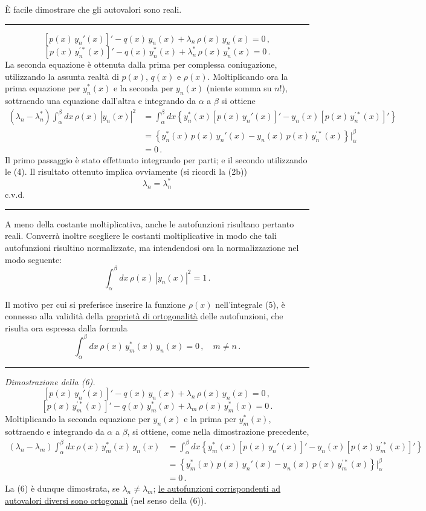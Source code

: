 \documentclass[11pt, a4paper]{book}
\numberwithin{equation}{section}
\begin{document}
È facile dimostrare che gli autovalori sono reali.

\hrule
\medskip
\[
\left[p(x)\,y_n'(x)\right]' - q(x)\,y_n(x) + \lambda_n\,\rho(x)\,y_n(x) = 0\,,
\]
\[
\left[p(x)\,y_n^{\prime*}(x)\right]' - q(x)\,y_n^*(x) + \lambda_n^*\,\rho(x)\,y_n^*(x) = 0\,.
\]
La seconda equazione è ottenuta dalla prima per complessa coniugazione, utilizzando la assunta realtà di $p(x)$, $q(x)$ e $\rho(x)$. Moltiplicando ora la prima equazione per $y_n^*(x)$ e la seconda per $y_n(x)$ (niente somma su $n$!), sottraendo una equazione dall'altra e integrando da $\alpha$ a $\beta$ si ottiene
\begin{align*}
(\lambda_n-\lambda_n^*)\int_\alpha^\beta dx\,\rho(x)\,|y_n(x)|^2
&= \int_\alpha^\beta dx\left\{y_n^*(x)\left[p(x)\,y_n'(x)\right]' - y_n(x)\left[p(x)\,y_n^{\prime*}(x)\right]'\right\}\\
&= \left\{y_n^*(x)\,p(x)\,y_n'(x) - y_n(x)\,p(x)\,y_n^{\prime*}(x)\right\}\Big|_\alpha^\beta\\
&= 0\,.
\end{align*}
Il primo passaggio è stato effettuato integrando per parti; e il secondo utilizzando le (4). Il risultato ottenuto implica ovviamente (si ricordi la (2b))
\[
\lambda_n = \lambda_n^*
\]
c.v.d.
\medskip\hrule\medskip

A meno della costante moltiplicativa, anche le autofunzioni risultano pertanto reali. Converrà inoltre scegliere le costanti moltiplicative in modo che tali autofunzioni risultino normalizzate, ma intendendosi ora la normalizzazione nel modo seguente:
\begin{equation}
\int_\alpha^\beta dx\,\rho(x)\,|y_n(x)|^2 = 1\,. \tag{5}
\end{equation}

Il motivo per cui si preferisce inserire la funzione $\rho(x)$ nell'integrale (5), è connesso alla validità della \underline{proprietà di ortogonalità} delle autofunzioni, che risulta ora espressa dalla formula
\begin{equation}
\int_\alpha^\beta dx\,\rho(x)\,y_m^*(x)\,y_n(x) = 0\,,\quad m\neq n\,. \tag{6}
\end{equation}

\hrule
\medskip
\noindent\textit{Dimostrazione della (6).}
\[
\left[p(x)\,y_n'(x)\right]' - q(x)\,y_n(x) + \lambda_n\,\rho(x)\,y_n(x) = 0\,,
\]
\[
\left[p(x)\,y_m^{\prime*}(x)\right]' - q(x)\,y_m^*(x) + \lambda_m\,\rho(x)\,y_m^*(x) = 0\,.
\]
Moltiplicando la seconda equazione per $y_n(x)$ e la prima per $y_m^*(x)$, sottraendo e integrando da $\alpha$ a $\beta$, si ottiene, come nella dimostrazione precedente,
\begin{align*}
(\lambda_n-\lambda_m)\int_\alpha^\beta dx\,\rho(x)\,y_m^*(x)\,y_n(x)
&= \int_\alpha^\beta dx\left\{y_m^*(x)\left[p(x)\,y_n'(x)\right]' - y_n(x)\left[p(x)\,y_m^{\prime*}(x)\right]'\right\}\\
&= \left\{y_m^*(x)\,p(x)\,y_n'(x) - y_n(x)\,p(x)\,y_m^{\prime*}(x)\right\}\Big|_\alpha^\beta\\
&= 0\,.
\end{align*}
La (6) è dunque dimostrata, se $\lambda_n\neq\lambda_m$; \underline{le autofunzioni corrispondenti ad autovalori diversi sono ortogonali} (nel senso della (6)).
\end{document}
